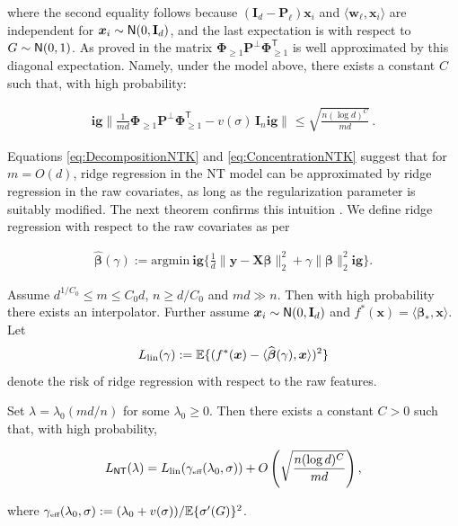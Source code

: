   where the second equality follows because $({\mathbf I}_d-{\boldsymbol P}_{\ell}){\boldsymbol x}_i$ and $\langle{\boldsymbol w}_{\ell},{\boldsymbol x}_i\rangle$ are independent for  ${\boldsymbol x}_i\sim{\sf N}(0,{\mathbf I}_d)$, and the last expectation is with respect to $G\sim{\sf N}(0,1)$. As proved in \cite{montanari2020interpolation} the matrix 
  ${\boldsymbol \Phi}_{\ge 1}{\boldsymbol P}^{\perp}{\boldsymbol \Phi}_{\ge 1}^{{\mathsf T}}$ is well approximated by this diagonal expectation. Namely, under the model above,  there exists a constant $C$ such that, with high probability:

  \begin{align}
    \mathbf{ig}\|\frac{1}{md} {\boldsymbol \Phi}_{\ge 1}{\boldsymbol P}^{\perp}{\boldsymbol \Phi}_{\ge 1}^{{\mathsf T}}-v(\sigma)\, {\mathbf I}_n\mathbf{ig}\|_{}\le
    \sqrt{\frac{n(\log d)^C}{md}}\, .\label{eq:ConcentrationNTK}
  \end{align}

  Equations \eqref{eq:DecompositionNTK} and \eqref{eq:ConcentrationNTK} suggest that for $m=O(d)$, ridge regression in the NT model can be approximated by ridge regression in the raw covariates, as long as the regularization parameter is suitably modified. The next theorem confirms this intuition \cite{montanari2020interpolation}. We define ridge regression with respect to the raw covariates as per 

  \begin{align}

   \widehat{\boldsymbol \beta}(\gamma):= \underset{}{\mathrm{argmin}} \ \mathbf{ig}\{\frac{1}{d}\big\|{\boldsymbol y}-{\boldsymbol X}{\boldsymbol \beta}\big\|_2^2+\gamma\|{\boldsymbol \beta}\|_2^2\mathbf{ig}\}.

  \end{align}

  \begin{theorem}
    Assume $d^{1/C_0}\le m\le C_0d$, $n\ge d/C_0$  and $md\gg n$. Then with high probability there exists an interpolator. Further assume ${\boldsymbol x}_i\sim{\sf N}(0,{\mathbf I}_d)$ and  $f^*({\boldsymbol x}) = \langle{\boldsymbol \beta}_*,{\boldsymbol x}\rangle$.
    Let $${L}_{{\rm lin}}(\gamma):=\mathbb{E}\{(f^*({\boldsymbol x})-\langle\widehat{\boldsymbol \beta}(\gamma),{\boldsymbol x}\rangle)^2\}$$ denote the risk of ridge regression with respect to the raw features.

   Set $\lambda=\lambda_0(md/n)$ for some $\lambda_0\ge 0$. Then there exists a constant $C>0$ such that, with high probability, 

    \begin{align}
      {L}_{{\sf NT}}(\lambda) = {L}_{{\rm lin}}(\gamma_{\mbox{\rm\tiny eff}}(\lambda_0,\sigma)) + O\left(\sqrt{\frac{n(\log d)^C}{md}}\right),
    \end{align}

    where $\gamma_{\mbox{\rm\tiny eff}}(\lambda_0,\sigma):=(\lambda_0+v(\sigma))/\mathbb{E}\{\sigma'(G)\}^2$.
  \end{theorem}

